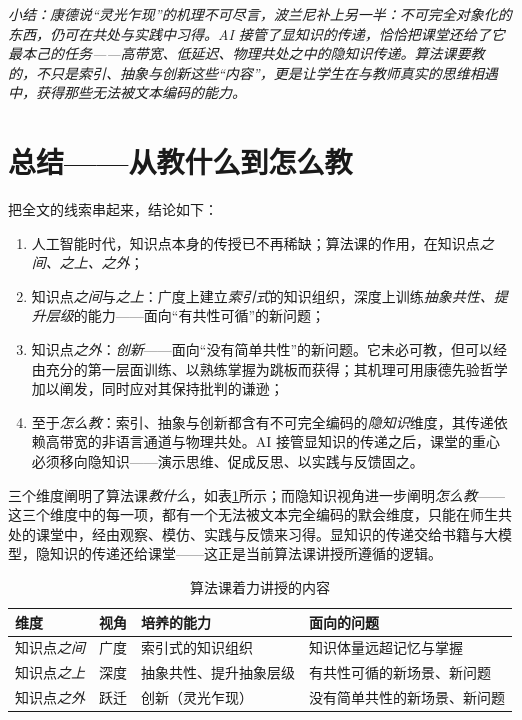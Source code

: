\nid\textit{小结：康德说“灵光乍现”的机理不可尽言，波兰尼补上另一半：不可完全对象化的东西，仍可在共处与实践中习得。AI 接管了显知识的传递，恰恰把课堂还给了它最本己的任务——高带宽、低延迟、物理共处之中的隐知识传递。算法课要教的，不只是索引、抽象与创新这些“内容”，更是让学生在与教师真实的思维相遇中，获得那些无法被文本编码的能力。}

\section{总结——从教什么到怎么教}

把全文的线索串起来，结论如下：
\begin{enumerate}[label=\arabic*.]
    \item 人工智能时代，知识点本身的传授已不再稀缺；算法课的作用，在知识点\textit{之间、之上、之外}；
    \item 知识点\textit{之间}与\textit{之上}：广度上建立\textit{索引式}的知识组织，深度上训练\textit{抽象共性、提升层级}的能力——面向“有共性可循”的新问题；
    \item 知识点\textit{之外}：\textit{创新}——面向“没有简单共性”的新问题。它未必可教，但可以经由充分的第一层面训练、以熟练掌握为跳板而获得；其机理可用康德先验哲学加以阐发，同时应对其保持批判的谦逊；
    \item 至于\textit{怎么教}：索引、抽象与创新都含有不可完全编码的\textit{隐知识}维度，其传递依赖高带宽的非语言通道与物理共处。AI 接管显知识的传递之后，课堂的重心必须移向隐知识——演示思维、促成反思、以实践与反馈固之。
\end{enumerate}


三个维度阐明了算法课\textit{教什么}，如表\ref{tab:three-dimensions-algorithm-knowledge}所示；而隐知识视角进一步阐明\textit{怎么教}——这三个维度中的每一项，都有一个无法被文本完全编码的默会维度，只能在师生共处的课堂中，经由观察、模仿、实践与反馈来习得。显知识的传递交给书籍与大模型，隐知识的传递还给课堂——这正是当前算法课讲授所遵循的逻辑。

\begin{table}[htbp]
    \centering
    \caption{算法课着力讲授的内容}
    \label{tab:three-dimensions-algorithm-knowledge}
    \begin{tabularx}{\textwidth}{l l >{\raggedright\arraybackslash}X >{\raggedright\arraybackslash}X}
        \toprule
        \textbf{维度} & \textbf{视角} & \textbf{培养的能力} & \textbf{面向的问题} \\
        \midrule
        知识点\textit{之间} & 广度 & 索引式的知识组织 & 知识体量远超记忆与掌握 \\
        知识点\textit{之上} & 深度 & 抽象共性、提升抽象层级 & 有共性可循的新场景、新问题 \\
        知识点\textit{之外} & 跃迁 & 创新（灵光乍现） & 没有简单共性的新场景、新问题 \\
        \bottomrule
    \end{tabularx}
\end{table}

